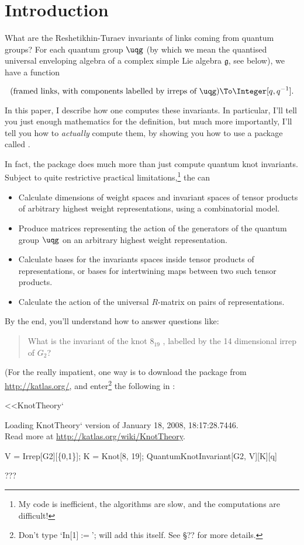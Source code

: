 \section{Introduction}
What are the Reshetikhin-Turaev invariants \cite{???} of links coming
from quantum groups? For each quantum group $\uqg$ (by which we mean the
quantised universal enveloping algebra of a complex simple Lie algebra
$\mathfrak{g}$, see below), we have a function

$$(\text{framed links, with components labelled by irreps of $\uqg$}) \To
\Integer[q,q^{-1}].$$

In this paper, I describe how one computes these invariants. In
particular, I'll tell you just enough mathematics for the definition, but
much more importantly, I'll tell you how to \emph{actually} compute them,
by showing you how to use a \MMA package called .

In fact, the package does much more than just compute quantum knot
invariants. Subject to quite restrictive practical
limitations,\footnote{My code is inefficient, the algorithms are slow,
and the computations are difficult!} the \pkg can
\begin{itemize}
\item Calculate dimensions of weight spaces and invariant spaces of
tensor products of arbitrary highest weight representations, using a
combinatorial model.
\item Produce matrices representing the action of the generators of the quantum group
$\uqg$ on an arbitrary highest weight representation.
\item Calculate bases for the invariants spaces inside tensor
products of representations, or bases for intertwining maps between two
such tensor products.
\item Calculate the action of the universal $R$-matrix on pairs of
representations.
\end{itemize}

By the end, you'll understand how to answer questions like:
\begin{quote}
What is the invariant of the knot $8_{19}$ , labelled by
the 14 dimensional irrep of $G_2$?
\end{quote}
(For the really impatient, one way is to download the 
\MMA package from \url{http://katlas.org/}, and enter\footnote{Don't type `{\color{blue}In[1]$:=$}'; \MMA will add this itself. See \S ?? for more details.} the following in \MMA:
\begin{mma}
\begin{inm}<<KnotTheory`\end{inm}
\begin{printm}Loading KnotTheory` version of January 18, 2008, 18:17:28.7446. \\
Read more at \url{http://katlas.org/wiki/KnotTheory}.
\end{printm}
\begin{inm}V = Irrep[G2][\{0,1\}]; K = Knot[8, 19];
QuantumKnotInvariant[G2, V][K][q]\end{inm} 
\begin{outm}???\end{outm}
\end{mma}

